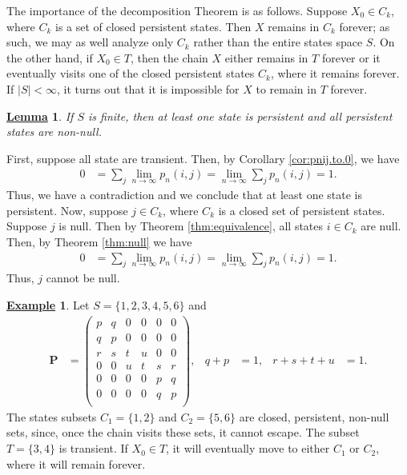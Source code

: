 \documentclass[12pt]{book}
\numberwithin{equation}{chapter}
\theoremstyle{plain}
\numberwithin{theorem}{section}
\newtheorem{lemma}[theorem]{\underline{Lemma}}   		%
\theoremstyle{definition}
\newtheorem{example}[theorem]{\underline{Example}}
\numberwithin{exercise}{chapter}
\let\oldendproof\endproof
\renewenvironment{proof}[1][\proofname]{%
  \oldproof[\scshape\underline{#1}]%
}{\oldendproof}
\newcommand{\<}{\langle}
\renewcommand{\>}{\rangle}
\renewcommand{\(}{\left(}
\renewcommand{\)}{\right)}
\renewcommand{\[}{\left[}
\renewcommand{\]}{\right]}
\newcommand\Pv{\pmb{P}}
\begin{document}
\noindent
The importance of the decomposition Theorem is as follows.  Suppose $X_0 \in C_k$, where $C_k$ is a set of closed persistent states.  Then $X$ remains in $C_k$ forever; as such, we may as well analyze only $C_k$ rather than the entire states space $S$.  On the other hand, if $X_0 \in T$, then the chain $X$ either remains in $T$ forever or it eventually visits one of the closed persistent states $C_k$, where it remains forever.  If $|S|<\infty$, it turns out that it is impossible for $X$ to remain in $T$ forever.

\begin{lemma}
\label{lem:persistent.non-null}
If $S$ is finite, then at least one state is persistent and all persistent states are non-null.
\end{lemma}

\begin{proof}
First, suppose all state are transient.  Then, by Corollary \ref{cor:pnij.to.0}, we have
\begin{align}
0
	&=	\sum_j \lim_{n \to \infty} p_n(i,j)
	=		\lim_{n \to \infty} \sum_j p_n(i,j)
	=		1 .
\end{align}
Thus, we have a contradiction and we conclude that at least one state is persistent.  Now, suppose $j \in C_k$, where $C_k$ is a closed set of persistent states.  Suppose $j$
is null.  Then by Theorem \ref{thm:equivalence}, all states $i \in C_k$ are null.  Then, by Theorem \ref{thm:null} we have
\begin{align}
0
	&=	\sum_j \lim_{n \to \infty} p_n(i,j)
	=		\lim_{n \to \infty}  \sum_j p_n(i,j)
	=		1 .
\end{align}
Thus, $j$ cannot be null.
\end{proof}

\begin{example}
Let $S = \{ 1, 2, 3, 4, 5, 6 \}$ and
\begin{align}
\Pv
	&=	\( \begin{array}{cccccc}
			p & q & 0 & 0 & 0 & 0 \\
			q & p & 0 & 0 & 0 & 0 \\
			r & s & t & u & 0 & 0 \\
			0 & 0 & u & t & s & r \\
			0 & 0 & 0 & 0 & p & q \\
			0 & 0 & 0 & 0 & q & p \\
			\end{array} \) , &
q+p
	&= 1 , &
r+s+t+u
	&=	1 .
\end{align}
The states subsets $C_1=\{1,2\}$ and $C_2 = \{5,6\}$ are closed, persistent, non-null sets, since, once the chain visits these sets, it cannot escape.  The subset $T=\{3,4\}$ is transient.  If $X_0 \in T$, it will eventually move to either $C_1$ or $C_2$, where it will remain forever.
\end{example}
\end{document}

